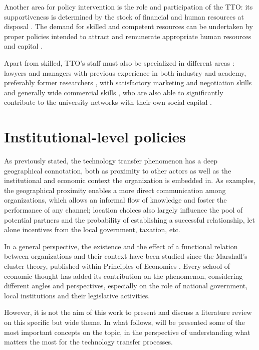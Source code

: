 Another area for policy intervention is the role and participation of the TTO: its supportiveness is determined by the stock of financial and human resources at disposal \citep{Siegel2007}. The demand for skilled and competent resources can be undertaken by proper policies intended to attract and remunerate appropriate human resources and capital \citep{Rasmussen2006}.

Apart from skilled, TTO's staff must also be specialized in different areas \citep{Guerrero2014}: lawyers and managers with previous experience in both industry and academy, preferably former researchers \citep{Debackere2005}, with satisfactory marketing and negotiation skills \citep{Siegel2003a} and generally wide commercial skills \citep{Siegel2007}, who are also able to significantly contribute to the university networks with their own social capital \citep{Geuna2009}.

\section{Institutional-level policies}

As previously stated, the technology transfer phenomenon has a deep geographical connotation, both as proximity to other actors as well as the institutional and economic context the organization is embedded in. As examples, the geographical proximity enables a more direct communication among organizations, which allows an informal flow of knowledge and foster the performance of any channel; location choices also largely influence the pool of potential partners and the probability of establishing a successful relationship, let alone incentives from the local government, taxation, etc.

In a general perspective, the existence and the effect of a functional relation between organizations and their context have been studied since the Marshall's cluster theory, published within Principles of Economics \citep{Marshall1890}. Every school of economic thought has added its contribution on the phenomenon, considering different angles and perspectives, especially on the role of national government, local institutions and their legislative activities.

However, it is not the aim of this work to present and discuss a literature review on this specific but wide theme. In what follows, will be presented some of the most important concepts on the topic, in the perspective of understanding what matters the most for the technology transfer processes.

